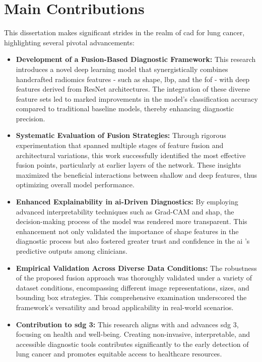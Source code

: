 \section{Main Contributions}

This dissertation makes significant strides in the realm of \ac{cad} for lung cancer, highlighting several pivotal advancements:

\begin{itemize}
    \item \textbf{Development of a Fusion-Based Diagnostic Framework:} This research introduces a novel deep learning model that synergistically combines handcrafted radiomics features - such as shape, \ac{lbp}, and the \ac{fof} - with deep features derived from ResNet architectures. The integration of these diverse feature sets led to marked improvements in the model's classification accuracy compared to traditional baseline models, thereby enhancing diagnostic precision.

    \item \textbf{Systematic Evaluation of Fusion Strategies:} Through rigorous experimentation that spanned multiple stages of feature fusion and architectural variations, this work successfully identified the most effective fusion points, particularly at earlier layers of the network. These insights maximized the beneficial interactions between shallow and deep features, thus optimizing overall model performance.

    \item \textbf{Enhanced Explainability in \ac{ai}-Driven Diagnostics:} By employing advanced interpretability techniques such as Grad-CAM and \ac{shap}, the decision-making process of the model was rendered more transparent. This enhancement not only validated the importance of shape features in the diagnostic process but also fostered greater trust and confidence in the \ac{ai} 's predictive outputs among clinicians.

    \item \textbf{Empirical Validation Across Diverse Data Conditions:} The robustness of the proposed fusion approach was thoroughly validated under a variety of dataset conditions, encompassing different image representations, sizes, and bounding box strategies. This comprehensive examination underscored the framework's versatility and broad applicability in real-world scenarios.

    \item \textbf{Contribution to \ac{sdg} 3:} This research aligns with and advances \ac{sdg} 3, focusing on health and well-being. Creating non-invasive, interpretable, and accessible diagnostic tools contributes significantly to the early detection of lung cancer and promotes equitable access to healthcare resources.
\end{itemize}


